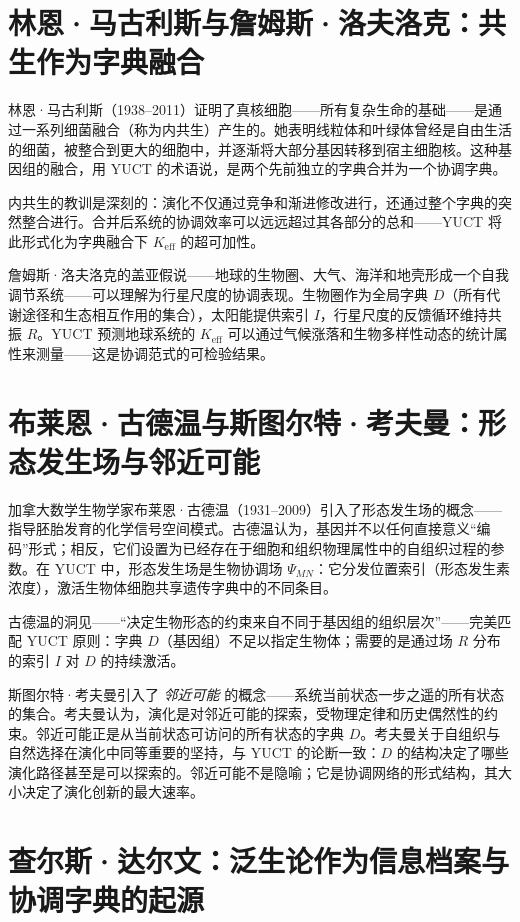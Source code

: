 \documentclass[12pt,a4paper]{article}
\begin{document}
	\section{林恩·马古利斯与詹姆斯·洛夫洛克：共生作为字典融合}
	
	林恩·马古利斯（1938–2011）证明了真核细胞——所有复杂生命的基础——是通过一系列细菌融合（称为内共生）产生的。她表明线粒体和叶绿体曾经是自由生活的细菌，被整合到更大的细胞中，并逐渐将大部分基因转移到宿主细胞核。这种基因组的融合，用 YUCT 的术语说，是两个先前独立的字典合并为一个协调字典。
	
	内共生的教训是深刻的：演化不仅通过竞争和渐进修改进行，还通过整个字典的突然整合进行。合并后系统的协调效率可以远远超过其各部分的总和——YUCT 将此形式化为字典融合下 \(K_{\mathrm{eff}}\) 的超可加性。
	
	詹姆斯·洛夫洛克的盖亚假说——地球的生物圈、大气、海洋和地壳形成一个自我调节系统——可以理解为行星尺度的协调表现。生物圈作为全局字典 \(D\)（所有代谢途径和生态相互作用的集合），太阳能提供索引 \(I\)，行星尺度的反馈循环维持共振 \(R\)。YUCT 预测地球系统的 \(K_{\mathrm{eff}}\) 可以通过气候涨落和生物多样性动态的统计属性来测量——这是协调范式的可检验结果。
	
	\section{布莱恩·古德温与斯图尔特·考夫曼：形态发生场与邻近可能}
	
	加拿大数学生物学家布莱恩·古德温（1931–2009）引入了形态发生场的概念——指导胚胎发育的化学信号空间模式。古德温认为，基因并不以任何直接意义“编码”形式；相反，它们设置为已经存在于细胞和组织物理属性中的自组织过程的参数。在 YUCT 中，形态发生场是生物协调场 \(\Psi_{MN}\)：它分发位置索引（形态发生素浓度），激活生物体细胞共享遗传字典中的不同条目。
	
	古德温的洞见——“决定生物形态的约束来自不同于基因组的组织层次”——完美匹配 YUCT 原则：字典 \(D\)（基因组）不足以指定生物体；需要的是通过场 \(R\) 分布的索引 \(I\) 对 \(D\) 的持续激活。
	
	斯图尔特·考夫曼引入了 \emph{邻近可能} 的概念——系统当前状态一步之遥的所有状态的集合。考夫曼认为，演化是对邻近可能的探索，受物理定律和历史偶然性的约束。邻近可能正是从当前状态可访问的所有状态的字典 \(D\)。考夫曼关于自组织与自然选择在演化中同等重要的坚持，与 YUCT 的论断一致：\(D\) 的结构决定了哪些演化路径甚至是可以探索的。邻近可能不是隐喻；它是协调网络的形式结构，其大小决定了演化创新的最大速率。
	
	\section{查尔斯·达尔文：泛生论作为信息档案与协调字典的起源}
	
\end{document}
